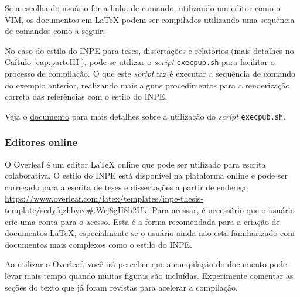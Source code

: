 Se a escolha do usuário for a linha de comando, utilizando um editor como o VIM, os documentos em LaTeX podem ser compilados utilizando uma sequência de comandos como a seguir:

No caso do estilo do INPE para teses, dissertações e relatórios (mais detalhes no Caítulo \ref{cap:parteIII}), pode-se utilizar o \textit{script} {\tt execpub.sh} para facilitar o processo de compilação. O que este \textit{script} faz é executar a sequência de comando do exemplo anterior, realizando mais alguns procedimentos para a renderização correta das referências com o estilo do INPE. 

\begin{marker}
  Veja o \href{http://mtc-m16d.sid.inpe.br/col/sid.inpe.br/mtc-m19@80/2010/03.24.15.12/doc/ambiente_latex_no_linux.pdf}{documento} para mais detalhes sobre a utilização do \textit{script} {\tt execpub.sh}.
\end{marker}

\subsubsection*{Editores online}
\label{sec:ed_online}

O Overleaf é um editor LaTeX online que pode ser utilizado para escrita colaborativa. O estilo do INPE está disponível na plataforma online e pode ser carregado para a escrita de teses e dissertações a partir de endereço \url{https://www.overleaf.com/latex/templates/inpe-thesis-template/scdyfqzhbycc#.Wrj8gH8h2Uk}. Para acessar, é necessário que o usuário crie uma conta para o acesso. Esta é a forma recomendada para a criação de documentos LaTeX, especialmente se o usuário ainda não está familiarizado com documentos mais complexos como o estilo do INPE.

\begin{marker}
  Ao utilizar o Overleaf, você irá perceber que a compilação do documento pode levar mais tempo quando muitas figuras são incluídas. Experimente comentar as seções do texto que já foram revistas para acelerar a compilação.
\end{marker}

